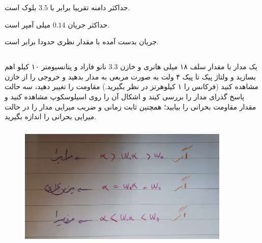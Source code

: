 \documentclass[12pt]{article}
\begin{document}
حداکثر دامنه تقریبا برابر با $3.5$ بلوک است.

حداکثر جریان $0.14$ میلی آمپر است.

جریان بدست آمده با مقدار نظری حدودا برابر است. 

\clearpage
\subsection{}
یک مدار  با مقدار سلف ۱۸ میلی هانری و خازن $3.3$ نانو فاراد و پتانسیومتر ۱۰ کیلو اهم بسازید و ولتاژ پیک تا پیک ۴ ولت به صورت مربعی به مدار بدهید و خروجی را از خازن مشاهده کنید (فرکانس را ۱ کیلوهرتز در نظر بگیرید.)						مقاومت را تغییر دهید، سه حالت پاسخ گذرای مدار را بررسی کیند و اشکال آن را روی اسیلوسکوپ مشاهده کنید و مقدار مقاومت بحرانی را بیابید؛ همچنین ثابت زمانی و ضریب میرایی مدار را در حالت میرایی بحرانی را اندازه بگیرید.


\begin{figure}[H]
\begin{center}
\includegraphics[width=0.9\textwidth, height=6cm]{./images/6.4.a}
\end{center}
\end{figure}
\end{document}
